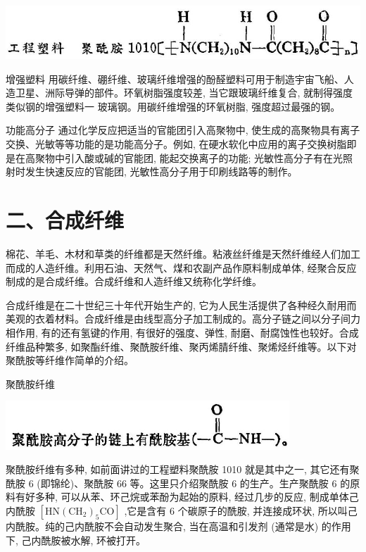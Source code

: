 \documentclass[10pt]{article}
\begin{document}
\begin{center}
\includegraphics[max width=1.0\textwidth]{images/01912d16-be99-77bb-9535-4f3ed8d9946f_193_778955.jpg}
\end{center}

增强塑料 用碳纤维、硼纤维、玻璃纤维增强的酚醛塑料可用于制造宇宙飞船、人造卫星、洲际导弹的部件。环氧树脂强度较差, 当它跟玻璃纤维复合, 就制得强度类似钢的增强塑料一 玻璃钢。用碳纤维增强的环氧树脂, 强度超过最强的钢。

功能高分子 通过化学反应把适当的官能团引入高聚物中, 使生成的高聚物具有离子交换、光敏等等功能的是功能高分子。例如, 在硬水软化中应用的离子交换树脂即是在高聚物中引入酸或碱的官能团, 能起交换离子的功能; 光敏性高分子有在光照射时发生快速反应的官能团, 光敏性高分子用于印刷线路等的制作。

\section*{二、合成纤维}

棉花、羊毛、木材和草类的纤维都是天然纤维。粘液丝纤维是天然纤维经人们加工而成的人造纤维。利用石油、天然气、煤和农副产品作原料制成单体, 经聚合反应制成的是合成纤维。合成纤维和人造纤维又统称化学纤维。

合成纤维是在二十世纪三十年代开始生产的, 它为人民生活提供了各种经久耐用而美观的衣着材料。合成纤维是由线型高分子加工制成的。高分子链之间以分子间力相作用, 有的还有氢键的作用, 有很好的强度、弹性, 耐磨、耐腐蚀性也较好。合成纤维品种繁多, 如聚酯纤维、聚酰胺纤维、聚丙烯腈纤维、聚烯烃纤维等。以下对聚酰胺等纤维作简单的介绍。

聚酰胺纤维

\begin{center}
\includegraphics[max width=0.8\textwidth]{images/01912d16-be99-77bb-9535-4f3ed8d9946f_194_290300.jpg}
\end{center}

聚酰胺纤维有多种, 如前面讲过的工程塑料聚酰胺 1010 就是其中之一, 其它还有聚酰胺 6 (即锦纶)、聚酰胺 66 等。这里只介绍聚酰胺 6 的生产。生产聚酰胺 6 的原料有好多种, 可以从苯、环己烷或苯酚为起始的原料, 经过几步的反应, 制成单体己内酰胺 \(\left\lbrack {\mathrm{{HN}}{\left( {\mathrm{{CH}}}_{2}\right) }_{5}\mathrm{{CO}}}\right\rbrack\) ,它是含有 6 个碳原子的酰胺, 并连接成环状, 所以叫己内酰胺。纯的己内酰胺不会自动发生聚合, 当在高温和引发剂 (通常是水) 的作用下, 己内酰胺被水解, 环被打开。
\end{document}

